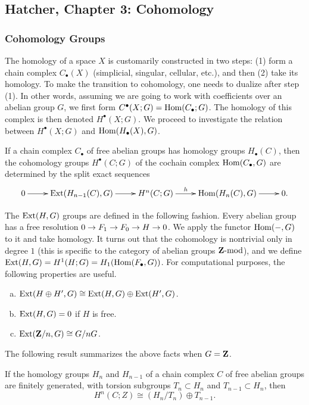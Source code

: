 \subsection{Hatcher, Chapter 3: Cohomology}

\subsubsection{Cohomology Groups}

The homology of a space $X$ is customarily constructed in two steps: (1) form a chain complex $C_\bullet(X)$ (simplicial, singular, cellular, etc.), and then (2) take its homology. To make the transition to cohomology, one needs to dualize after step (1). In other words, assuming we are going to work with coefficients over an abelian group $G$, we first form $C^\bullet(X; G) = \operatorname{Hom}(C_\bullet; G)$. The homology of this complex is then denoted $H^\bullet(X; G)$. We proceed to investigate the relation between $H^\bullet(X; G)$ and $\operatorname{Hom}(H_\bullet(X), G)$.

\begin{theorem}
  If a chain complex $C_\bullet$ of free abelian groups has homology groups $H_\bullet(C)$, then the cohomology groups $H^\bullet(C; G)$ of the cochain complex $\operatorname{Hom}(C_\bullet, G)$ are determined by the split exact sequences
  \[\xymatrix{
    0 \ar[r] & \Ext(H_{n-1}(C), G) \ar[r] & H^n(C; G) \ar[r]^-{h} & \Hom(H_n(C), G) \ar[r] & 0.
  }\]
\end{theorem}

The $\operatorname{Ext}(H,G)$ groups are defined in the following fashion. Every abelian group has a free resolution $0 \rightarrow F_1 \rightarrow F_0 \rightarrow H \rightarrow 0$. We apply the functor $\operatorname{Hom}(-,G)$ to it and take homology. It turns out that the cohomology is nontrivial only in degree $1$ (this is specific to the category of abelian groups $\mathbf{Z}\textnormal{-mod}$), and we define $\operatorname{Ext}(H, G) = H^1(H; G) = H_1(\operatorname{Hom}(F_\bullet, G))$. For computational purposes, the following properties are useful.
\begin{enumerate}[(a)]
\item $\operatorname{Ext}(H \oplus H', G) \cong \operatorname{Ext}(H, G) \oplus \operatorname{Ext}(H', G)$.
\item $\operatorname{Ext}(H,G) = 0$ if $H$ is free.
\item $\operatorname{Ext}(\mathbf{Z}/n, G) \cong G/n G$.
\end{enumerate}
The following result summarizes the above facts when $G = \mathbf{Z}$.

\begin{corollary}
  If the homology groups $H_n$ and $H_{n-1}$ of a chain complex $C$ of free abelian groups are finitely generated, with torsion subgroups $T_n \subset H_n$ and $T_{n-1} \subset H_n$, then
  \[
  H^n(C; Z) \cong (H_n/T_n) \oplus T_{n-1}.
  \]
\end{corollary}

